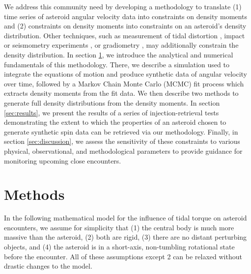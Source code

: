 \documentclass[fleqn,usenatbib]{mnras}
\begin{document}
We address this community need by developing a methodology to translate (1) time series of asteroid angular velocity data into constraints on density moments and (2) constraints on density moments into constraints on an asteroid's density distribution. Other techniques, such as measurement of tidal distortion \cite{RICHARDSON199847}, impact or seismometry experiments \cite{RICHARDSON2005325}, or gradiometry \cite{carroll2018tidal}, may additionally constrain the density distribution. In section \ref{sec:methods}, we introduce the analytical and numerical fundamentals of this methodology. There, we describe a simulation used to integrate the equations of motion and produce synthetic data of angular velocity over time, followed by a Markov Chain Monte Carlo (MCMC) fit process which  extracts density moments from the fit data. We then describe two methods to generate full density distributions from the density moments. In section \ref{sec:results}, we present the results of a series of injection-retrieval tests demonstrating the extent to which the properties of an asteroid chosen to generate synthetic spin data can be retrieved via our methodology. Finally, in section \ref{sec:discussion}, we assess the sensitivity of these constraints to various physical, observational, and methodological parameters to provide guidance for monitoring upcoming close encounters.





\section{Methods}
\label{sec:methods}

In the following mathematical model for the influence of tidal torque on asteroid encounters, we assume for simplicity that (1) the central body is much more massive than the asteroid, (2) both are rigid, (3) there are no distant perturbing objects, and (4) the asteroid is in a short-axis, non-tumbling rotational state before the encounter. All of these assumptions except 2 can be relaxed without drastic changes to the model.
\end{document}
